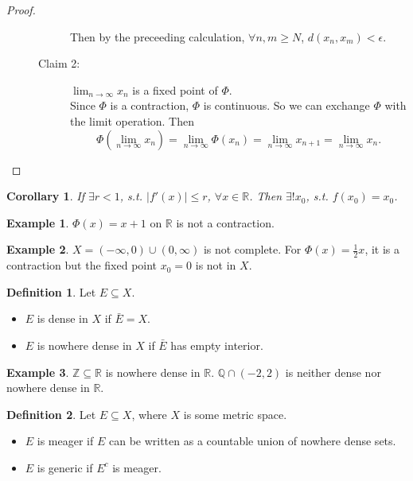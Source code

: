 \documentclass[12pt]{article}
\theoremstyle{plain}
\newtheorem*{corollary}{Corollary}
\theoremstyle{definition}
\newtheorem*{defn}{Definition}
\newtheorem*{eg}{Example}
\begin{document}
\begin{proof}
\begin{description}
\begin{description}
                    Then by the preceeding calculation, $\forall n,m\geq N$,
                    $d(x_n,x_m)<\epsilon$.
                \item[Claim 2:]
                    $\lim_{n\rightarrow\infty}x_n$ is a fixed point of $\Phi$.\\
                    Since $\Phi$ is a contraction, $\Phi$ is continuous. So we
                    can exchange $\Phi$ with the limit operation. Then
                    $$\Phi(\lim_{n\rightarrow \infty} x_n)=
                    \lim_{n\rightarrow \infty}\Phi(x_n)
                    =\lim_{n\rightarrow\infty}x_{n+1}
                    =\lim_{n\rightarrow\infty}x_{n}.$$
            \end{description}
    \end{description}
\end{proof}

\begin{corollary}
    If $\exists r<1$, s.t. $|f'(x)|\leq r$, $\forall x\in\mathbb{R}$.
    Then $\exists! x_0$, s.t. $f(x_0)=x_0$.
\end{corollary}

\begin{eg}
    $\Phi(x)=x+1$ on $\mathbb{R}$ is not a contraction.
\end{eg}

\begin{eg}
    $X=(-\infty,0)\cup(0,\infty)$ is not complete.
    For $\Phi(x)=\frac{1}{2}x$, it is a contraction but the fixed point $x_0=0$
    is not in $X$.
\end{eg}

\begin{defn}
    Let $E\subseteq X$.
    \begin{itemize}
        \item
            $E$ is dense in $X$ if $\bar{E}=X$.
        \item
            $E$ is nowhere dense in $X$ if $\bar{E}$ has empty interior.
    \end{itemize}
\end{defn}

\begin{eg}
    $\mathbb{Z}\subseteq \mathbb{R}$ is nowhere dense in $\mathbb{R}$.
    $\mathbb{Q}\cap (-2,2)$ is neither dense nor nowhere dense in $\mathbb{R}$.
\end{eg}

\begin{defn}
    Let $E\subseteq X$, where $X$ is some metric space.
    \begin{itemize}
        \item
        $E$ is meager if $E$ can be written as a countable union of nowhere
        dense sets.
        \item
        $E$ is generic if $E^c$ is meager.
    \end{itemize}
\end{defn}
\end{document}
